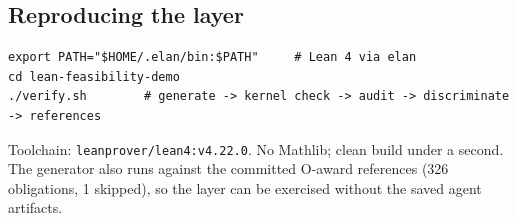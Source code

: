 \subsection{Reproducing the layer}
\begin{verbatim}
export PATH="$HOME/.elan/bin:$PATH"     # Lean 4 via elan
cd lean-feasibility-demo
./verify.sh        # generate -> kernel check -> audit -> discriminate -> references
\end{verbatim}
Toolchain: \texttt{leanprover/lean4:v4.22.0}. No Mathlib; clean build under a
second. The generator also runs against the committed O-award references
(326 obligations, 1 skipped), so the layer can be exercised without the saved
agent artifacts.
